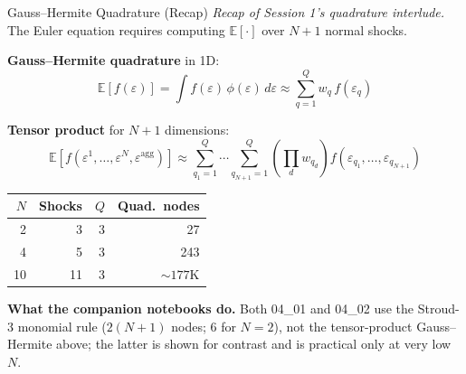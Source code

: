 \documentclass[aspectratio=169,11pt]{beamer}
\newcommand{\emphc}[1]{\textcolor{harvardcrimson}{#1}}
\newcommand{\E}[1]{\mathbb{E}\!\left[#1\right]}
\begin{document}
\begin{frame}{Gauss--Hermite Quadrature (Recap)}
{\scriptsize\emph{Recap of Session 1's quadrature interlude.}}\vspace{-0.3em}
\footnotesize
The Euler equation requires computing $\E{\cdot}$ over $N+1$ normal shocks.

\textbf{Gauss--Hermite quadrature} in 1D:
\[
\E{f(\varepsilon)} = \int f(\varepsilon)\, \phi(\varepsilon)\,d\varepsilon \approx \sum_{q=1}^{Q} w_q \, f(\varepsilon_q)
\]

\textbf{Tensor product} for $N+1$ dimensions:
\[
\E{f(\varepsilon^1, \ldots, \varepsilon^N, \varepsilon^{\text{agg}})} \approx \sum_{q_1=1}^{Q}\cdots\sum_{q_{N+1}=1}^{Q} \left(\prod_{d} w_{q_d}\right) f(\varepsilon_{q_1}, \ldots, \varepsilon_{q_{N+1}})
\]

\begin{center}
\begin{tabular}{rrrr}
\toprule
$N$ & \textbf{Shocks} & $Q$ & \textbf{Quad.\ nodes} \\
\midrule
2 & 3 & 3 & 27 \\
4 & 5 & 3 & 243 \\
10 & 11 & 3 & $\sim 177$K \\
\bottomrule
\end{tabular}
\end{center}

\vspace{0.2em}
{\footnotesize \textbf{What the companion notebooks do.} Both 04\_01 and 04\_02 use the \emphc{Stroud-3 monomial rule} ($2(N+1)$ nodes; $6$ for $N=2$), not the tensor-product Gauss--Hermite above; the latter is shown for contrast and is practical only at very low $N$.}
\end{frame}
\end{document}
